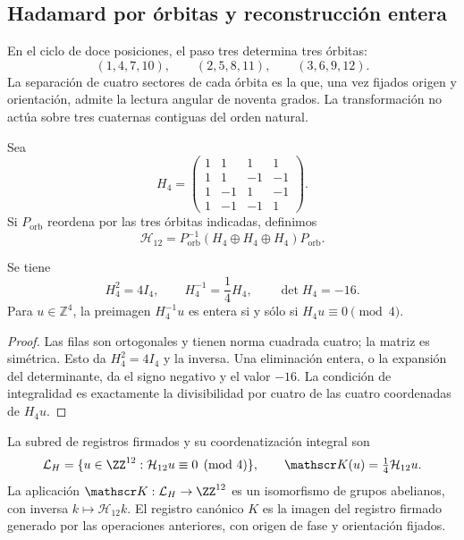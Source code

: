 \subsection{Hadamard por órbitas y reconstrucción entera}
\label{x_reciprocidad:subsec:k-hadamard}

En el ciclo de doce posiciones, el paso tres determina tres órbitas:
\[
 (1,4,7,10),\qquad(2,5,8,11),\qquad(3,6,9,12).
\]
La separación de cuatro sectores de cada órbita es la que, una vez fijados
origen y orientación, admite la lectura angular de noventa grados. La
transformación no actúa sobre tres cuaternas contiguas del orden natural.

Sea
\[
 H_4=\begin{pmatrix}
 1&1&1&1\\1&1&-1&-1\\1&-1&1&-1\\1&-1&-1&1
 \end{pmatrix}.
\]
Si \(P_{\mathrm{orb}}\) reordena por las tres órbitas indicadas,
definimos
\[
 \mathcal H_{12}=P_{\mathrm{orb}}^{-1}
 (H_4\oplus H_4\oplus H_4)P_{\mathrm{orb}}.
\]

\begin{lemma}
\label{x_reciprocidad:lem:k-hadamard}
Se tiene
\[
 H_4^2=4I_4,\qquad H_4^{-1}=\frac14H_4,\qquad\det H_4=-16.
\]
Para \(u\in\mathbb Z^4\), la preimagen \(H_4^{-1}u\) es entera si y
sólo si \(H_4u\equiv0\pmod4\).
\end{lemma}

\begin{proof}
Las filas son ortogonales y tienen norma cuadrada cuatro; la matriz es
simétrica. Esto da \(H_4^2=4I_4\) y la inversa. Una eliminación entera,
o la expansión del determinante, da el signo negativo y el valor \(-16\).
La condición de integralidad es exactamente la divisibilidad por cuatro
de las cuatro coordenadas de \(H_4u\).
\end{proof}

\begin{definition}
La subred de registros firmados y su coordenatización integral son
\[
 \mathcal L_H=\{u\in\ZZ^{12}:\mathcal H_{12}u\equiv0\pmod4\},
 \qquad \mathscr K(u)=\tfrac14\mathcal H_{12}u.
\]
La aplicación \(\mathscr K:\mathcal L_H\to\ZZ^{12}\) es un isomorfismo
de grupos abelianos, con inversa \(k\mapsto\mathcal H_{12}k\).
El registro canónico \(K\) es la imagen del registro firmado generado
por las operaciones anteriores, con origen de fase y orientación fijados.
\end{definition}

